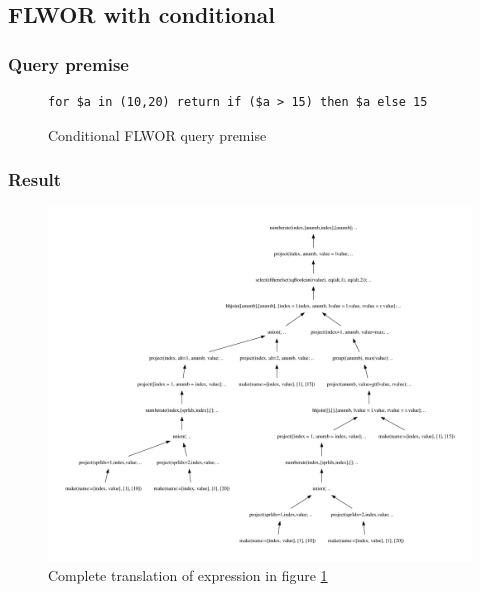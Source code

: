 \subsection{FLWOR with conditional}
\subsubsection{Query premise}
\begin{figure}[!htp]
\begin{center}
\begin{Verbatim}
for $a in (10,20) return if ($a > 15) then $a else 15
\end{Verbatim}
  \caption{Conditional FLWOR query premise}
  \label{fig:results:query_conditional_flwor}
\end{center}
\end{figure}

\subsubsection{Result}
\begin{figure}[!htp]
\begin{center}
  \includegraphics[width=1.0\textwidth]{img/graphs/td_impl_flwor_ifthenelse_xq_relalg}
  \caption{Complete translation of expression in figure
  \ref{fig:results:query_conditional_flwor}}
  \label{fig:results:query_conditional_flwor_result}
\end{center}
\end{figure}

